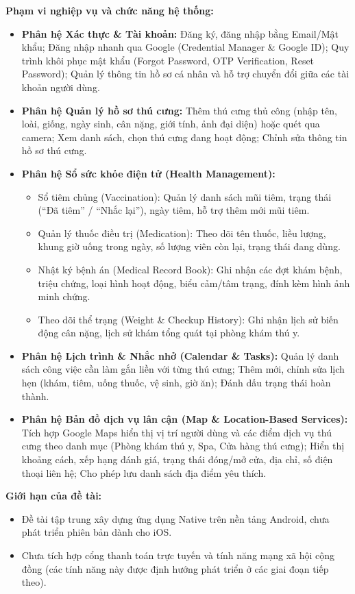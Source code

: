 \textbf{Phạm vi nghiệp vụ và chức năng hệ thống:}
\begin{itemize}
    \item \textbf{Phân hệ Xác thực \& Tài khoản:} Đăng ký, đăng nhập bằng Email/Mật khẩu; Đăng nhập nhanh qua Google (Credential Manager \& Google ID); Quy trình khôi phục mật khẩu (Forgot Password, OTP Verification, Reset Password); Quản lý thông tin hồ sơ cá nhân và hỗ trợ chuyển đổi giữa các tài khoản người dùng.
    \item \textbf{Phân hệ Quản lý hồ sơ thú cưng:} Thêm thú cưng thủ công (nhập tên, loài, giống, ngày sinh, cân nặng, giới tính, ảnh đại diện) hoặc quét qua camera; Xem danh sách, chọn thú cưng đang hoạt động; Chỉnh sửa thông tin hồ sơ thú cưng.
    \item \textbf{Phân hệ Sổ sức khỏe điện tử (Health Management):}
    \begin{itemize}
        \item Sổ tiêm chủng (Vaccination): Quản lý danh sách mũi tiêm, trạng thái (``Đã tiêm'' / ``Nhắc lại''), ngày tiêm, hỗ trợ thêm mới mũi tiêm.
        \item Quản lý thuốc điều trị (Medication): Theo dõi tên thuốc, liều lượng, khung giờ uống trong ngày, số lượng viên còn lại, trạng thái đang dùng.
        \item Nhật ký bệnh án (Medical Record Book): Ghi nhận các đợt khám bệnh, triệu chứng, loại hình hoạt động, biểu cảm/tâm trạng, đính kèm hình ảnh minh chứng.
        \item Theo dõi thể trạng (Weight \& Checkup History): Ghi nhận lịch sử biến động cân nặng, lịch sử khám tổng quát tại phòng khám thú y.
    \end{itemize}
    \item \textbf{Phân hệ Lịch trình \& Nhắc nhở (Calendar \& Tasks):} Quản lý danh sách công việc cần làm gắn liền với từng thú cưng; Thêm mới, chỉnh sửa lịch hẹn (khám, tiêm, uống thuốc, vệ sinh, giờ ăn); Đánh dấu trạng thái hoàn thành.
    \item \textbf{Phân hệ Bản đồ dịch vụ lân cận (Map \& Location-Based Services):} Tích hợp Google Maps hiển thị vị trí người dùng và các điểm dịch vụ thú cưng theo danh mục (Phòng khám thú y, Spa, Cửa hàng thú cưng); Hiển thị khoảng cách, xếp hạng đánh giá, trạng thái đóng/mở cửa, địa chỉ, số điện thoại liên hệ; Cho phép lưu danh sách địa điểm yêu thích.
\end{itemize}

\textbf{Giới hạn của đề tài:}
\begin{itemize}
    \item Đề tài tập trung xây dựng ứng dụng Native trên nền tảng Android, chưa phát triển phiên bản dành cho iOS.
    \item Chưa tích hợp cổng thanh toán trực tuyến và tính năng mạng xã hội cộng đồng (các tính năng này được định hướng phát triển ở các giai đoạn tiếp theo).
\end{itemize}

